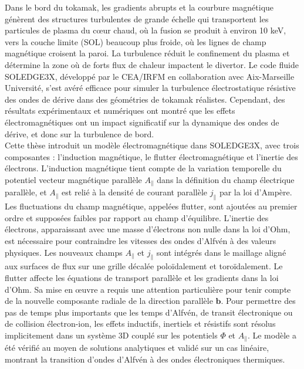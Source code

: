 \label{chap:resume}


Dans le bord du tokamak, les gradients abrupts et la courbure magnétique génèrent des structures turbulentes de grande échelle qui transportent les particules de plasma du cœur chaud, où la fusion se produit à environ 10 keV, vers la couche limite (SOL) beaucoup plus froide, où les lignes de champ magnétique croisent la paroi. La turbulence réduit le confinement du plasma et détermine la zone où de forts flux de chaleur impactent le divertor. Le code fluide SOLEDGE3X, développé par le CEA/IRFM en collaboration avec Aix-Marseille Université, s'est avéré efficace pour simuler la turbulence électrostatique résistive des ondes de dérive dans des géométries de tokamak réalistes. Cependant, des résultats expérimentaux et numériques ont montré que les effets électromagnétiques ont un impact significatif sur la dynamique des ondes de dérive, et donc sur la turbulence de bord. \\

Cette thèse introduit un modèle électromagnétique dans SOLEDGE3X, avec trois composantes : l'induction magnétique, le flutter électromagnétique et l'inertie des électrons. L'induction magnétique tient compte de la variation temporelle du potentiel vecteur magnétique parallèle $A_\parallel$ dans la définition du champ électrique parallèle, et $A_\parallel$ est relié à la densité de courant parallèle $j_\parallel$ par la loi d'Ampère. Les fluctuations du champ magnétique, appelées flutter, sont ajoutées au premier ordre et supposées faibles par rapport au champ d'équilibre. L'inertie des électrons, apparaissant avec une masse d'électrons non nulle dans la loi d'Ohm, est nécessaire pour contraindre les vitesses des ondes d'Alfvén à des valeurs physiques. Les nouveaux champs $A_\parallel$ et $j_\parallel$ sont intégrés dans le maillage aligné aux surfaces de flux sur une grille décalée poloïdalement et toroïdalement. Le flutter affecte les équations de transport parallèle et les gradients dans la loi d'Ohm. Sa mise en œuvre a requis une attention particulière pour tenir compte de la nouvelle composante radiale de la direction parallèle $\textbf{b}$. Pour permettre des pas de temps plus importants que les temps d'Alfvén, de transit électronique ou de collision électron-ion, les effets inductifs, inertiels et résistifs sont résolus implicitement dans un système 3D couplé sur les potentiels $\Phi$ et $A_\parallel$. Le modèle a été vérifié au moyen de solutions analytiques et validé sur un cas linéaire, montrant la transition d'ondes d'Alfvén à des ondes électroniques thermiques. \\


